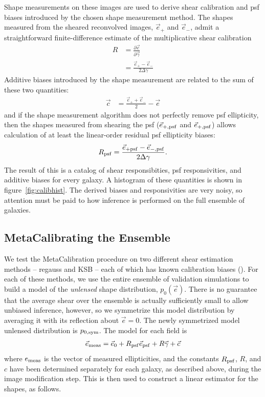 \documentclass[iop]{emulateapj}
\begin{document}
Shape measurements on these images are used to derive shear
calibration and psf biases {introduced by the chosen shape measurement
  method}. The shapes measured from the sheared reconvolved images,
$\vec{e}_{+}$ and $\vec{e}_{-}$, admit a straightforward
finite-difference estimate of the multiplicative shear calibration
\begin{align}
R &= \frac{\partial \vec{e}}{\partial \vec{\gamma}}  \\
 &=\frac{\vec{e}_{+} - \vec{e}_{-}}{2\Delta\gamma}
\end{align}
Additive biases introduced by the shape measurement are related to the sum of these two quantities:
\begin{align}
\vec{c} &= \frac{\vec{e}_{+} + \vec{e}_{-}}{2} - \vec{e}
\end{align}
and if the shape measurement algorithm does not perfectly remove psf
ellipticity, then the shapes measured from shearing the psf
($\vec{e}_{+,\rm psf}$ and $\vec{e}_{+,\rm psf}$) allows calculation
of at least the linear-order residual psf ellipticity biases:
\begin{align}
R_{\rm psf} = \frac{\vec{e}_{+\rm psf} - \vec{e}_{-,\rm psf}}{2\Delta\gamma}.
\end{align}
The result of this is a catalog of shear responsibities, psf
responsivities, and additive biases for every galaxy. A histogram of
these quantities is shown in figure~\ref{fig:calibhist}. The derived
biases and responsivities are very noisy, so attention must be paid to
how inference is performed on the full ensemble of galaxies.






\subsection{MetaCalibrating the Ensemble}
We test the MetaCalibration procedure on two different shear
estimation methods -- {\sc regauss} and {\sc KSB} -- each of which has
known calibration biases (). For each of these methods, we use the
entire ensemble of validation simulations to build a model of the {\it
  unlensed} shape distribution, $p_0(\vec{e})$. There is no guarantee
that the average shear over the ensemble is actually sufficiently
small to allow unbiased inference, however, so we symmetrize this
model distribution by averaging it with its reflection about
$\vec{e}=0$. The newly symmetrized model unlensed distribution is
$p_{0,\rm sym}$. The model for each field is
\begin{align}
\vec{e}_{\rm meas} = \vec{e}_{0} + R_{\rm psf} \vec{e}_{\rm psf} + R\vec{\gamma} + \vec{c}
\label{eqn:edist_model}
\end{align}
where $e_{\rm meas}$ is the vector of measured ellipticities, and the
constants $R_{\rm psf}$, $R$, and $c$ have been determined separately
for each galaxy, as described above, during the image modification
step. This is then used to construct a linear estimator for the
shapes, as follows.
\end{document}
